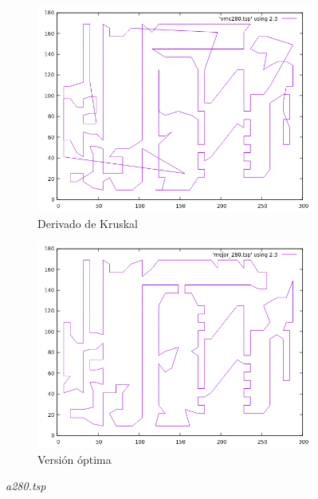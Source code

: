 \documentclass[12pt,spanish]{article}
\begin{document}
\begin{figure}[H]
\begin{subfigure}[b]{0.36\textwidth}
\includegraphics[width=\textwidth]{a280_vmc.png}
\caption{Derivado de Kruskal}
\end{subfigure}
\quad
\begin{subfigure}[b]{0.36\textwidth}
\includegraphics[width=\textwidth]{a280_mejor.png}
\caption{Versión óptima}
\end{subfigure}
\caption{\textit{a280.tsp}}
\end{figure}
\end{document}
